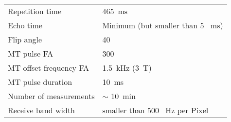 \begin{table}[H]
\begin{tabularx}{\linewidth}{@{} s | X @{}}
Repetition time	                                                            	& \num[round-precision = 0, round-mode = places]{465}\SI{}{\milli\second}\\
Echo time	                                                                        	& Minimum (but smaller than \num{5} \SI{}{\milli\second})                                          \\
Flip angle                                                                                 	& 40                                          \\
MT pulse FA									& 300 					\\
MT offset frequency FA							& \SI{1.5}{\kilo\hertz} (\SI{3}{\tesla})\\
MT pulse duration 								& \num[round-precision = 0, round-mode = places]{10}\SI{}{\milli\second}\\
Number of measurements                                                  & $\sim$ \num[round-precision = 0, round-mode = places]{10}\SI{}{\minute}     \\
Receive band width 							& smaller than \num[round-precision = 0, round-mode = places]{500} \SI{}{\hertz} per Pixel 	\\
\bottomrule
\end{tabularx}
\end{table}
